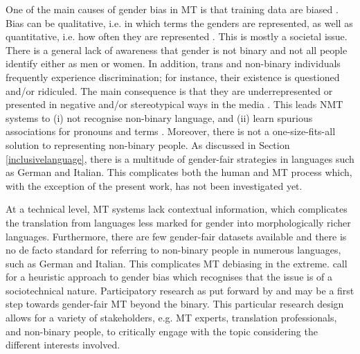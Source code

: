 One of the main causes of gender bias in MT is that training data are biased \citep{vanmassenhove-etal-2019-lost,vanmassenhove2021machine}. Bias can be qualitative, i.e. in which terms the genders are represented, as well as quantitative, i.e. how often they are represented \citep{savoldi2021gender}. This is mostly a societal issue. There is a general lack of awareness that gender is not binary and not all people identify either as men or women. In addition, trans and non-binary individuals frequently experience discrimination; for instance, their existence is questioned and/or ridiculed. The main consequence is that they are underrepresented or presented in negative and/or stereotypical ways in the media \citep{mclaren2021see}. This leads NMT systems to (i) not recognise non-binary language, and (ii) learn spurious associations for pronouns and terms \citep[1970]{dev-etal-2021-harms}. Moreover, there is not a one-size-fits-all solution to representing non-binary people. As discussed in Section \ref{inclusivelanguage}, there is a multitude of gender-fair strategies in languages such as German and Italian. This complicates both the human and MT process which, with the exception of the present work, has not been investigated yet. 

At a technical level, MT systems lack contextual information, which complicates the translation from languages less marked for gender into morphologically richer languages. Furthermore, there are few gender-fair datasets available and there is no de facto standard for referring to non-binary people in numerous languages, such as German and Italian. This complicates MT debiasing in the extreme. \textcite{savoldi2021gender} call for a heuristic approach to gender bias which recognises that the issue is of a sociotechnical nature. Participatory research as put forward by \textcite{burtscher-2022-genderfairmt} and \textcite{gromann2023participatory} may be a first step towards gender-fair MT beyond the binary. This particular research design allows for a variety of stakeholders, e.g. MT experts, translation professionals, and non-binary people, to critically engage with the topic considering the different interests involved. 


